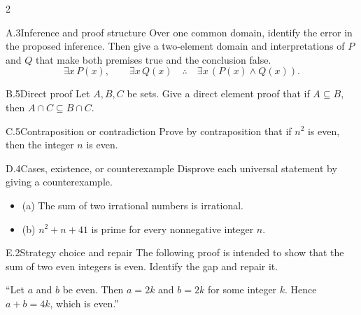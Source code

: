\documentclass[9pt]{extarticle}
\begin{document}
\begin{multicols}{2}
\begin{CoreProblem}{A.3}{Inference and proof structure}
Over one common domain, identify the error in the proposed inference. Then give
a two-element domain and interpretations of $P$ and $Q$ that make both premises
true and the conclusion false.
\[
\exists x\,P(x),\qquad \exists x\,Q(x)
\quad\therefore\quad
\exists x\,(P(x)\land Q(x)).
\]
\end{CoreProblem}
\begin{CoreProblem}{B.5}{Direct proof}
Let $A,B,C$ be sets. Give a direct element proof that if $A\subseteq B$, then
$A\cap C\subseteq B\cap C$.
\end{CoreProblem}
\begin{CoreProblem}{C.5}{Contraposition or contradiction}
Prove by contraposition that if $n^2$ is even, then the integer $n$ is even.
\end{CoreProblem}
\columnbreak
\begin{CoreProblem}{D.4}{Cases, existence, or counterexample}
Disprove each universal statement by giving a counterexample.
\begin{itemize}
  \item (a) The sum of two irrational numbers is irrational.
  \item (b) $n^2+n+41$ is prime for every nonnegative integer $n$.
\end{itemize}
\end{CoreProblem}
\begin{CoreProblem}{E.2}{Strategy choice and repair}
The following proof is intended to show that the sum of two even integers is even. Identify the gap and repair it.

``Let $a$ and $b$ be even. Then $a=2k$ and $b=2k$ for some integer $k$. Hence $a+b=4k$, which is even.''
\end{CoreProblem}
\end{multicols}
\CoreWorkArea
\FormBreak
{}
\end{document}
